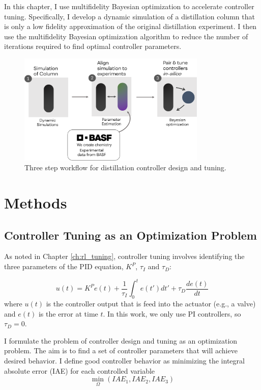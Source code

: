 In this chapter, I use multifidelity Bayesian optimization to accelerate controller tuning. Specifically, I develop a dynamic simulation of a distillation column that is only a low fidelity approximation of the original distillation experiment. I then use the multifidelity Bayesian optimization algorithm to reduce the number of iterations required to find optimal controller parameters. 

\begin{figure}
    \centering
    \includegraphics[width=0.8\textwidth]{gfx/Chapter06/tuning_workflow.png}
    \caption{Three step workflow for distillation controller design and tuning. }
    \label{fig:tuning_workflow}
\end{figure}

\section{Methods}

\subsection{Controller Tuning as an Optimization Problem}

As noted in Chapter \ref{ch:rl_tuning}, controller tuning involves identifying the three parameters of the PID equation, $K^P$, $\tau_I$ and $\tau_D$:

\begin{equation}
    u(t) = K^P e(t) + \frac{1}{\tau_I}\int_0^t e(t')dt' + \tau_D \frac{de(t)}{dt}
\end{equation}
where $u(t)$ is the controller output that is feed into the actuator (e.g., a valve) and $e(t)$ is the error at time $t$. In this work, we only use PI controllers, so $\tau_D=0$.

I formulate the problem of controller design and tuning as an optimization problem. The aim is to find a set of controller parameters that will achieve desired behavior. I define good controller behavior as minimizing the integral absolute error (IAE) for each controlled variable
\begin{equation}
    \min_{\Omega}(IAE_1, IAE_2, IAE_3)
\end{equation}



